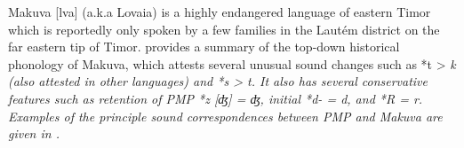 Makuva [lva] (a.k.a Lovaia) is a highly endangered language of
eastern Timor which is reportedly only spoken by a few families
in the Lautém district on the far eastern tip of Timor.
\citet{vanEngelenhoven2009} provides a summary of the top-down
historical phonology of Makuva,
which attests several unusual sound changes such as *t > \it{k}
(also attested in other  languages)
and *s > \it{t}.
It also has several conservative features such as retention of
PMP *z [ʤ] = \it{ʤ}, initial *d- = \it{d}, and *R = \it{r}.
Examples of the principle sound correspondences between PMP
and Makuva are given in .

